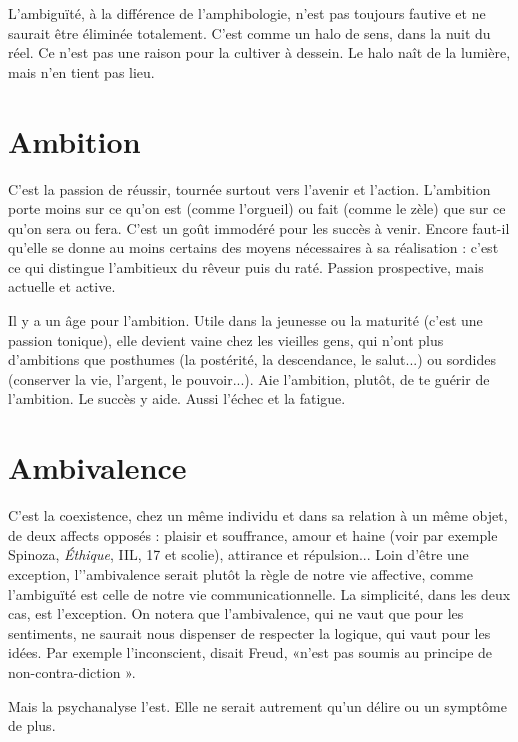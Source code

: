 L’ambiguïté, à la différence de l’amphibologie, n’est pas toujours fautive et
ne saurait être éliminée totalement. C’est comme un halo de sens, dans la nuit
du réel. Ce n’est pas une raison pour la cultiver à dessein. Le halo naît de la
lumière, mais n’en tient pas lieu.

\section{Ambition}
C'est la passion de réussir, tournée surtout vers l’avenir et l’action.
L’ambition porte moins sur ce qu’on est (comme l’orgueil) ou fait (comme
le zèle) que sur ce qu’on sera ou fera. C’est un goût immodéré pour les succès
à venir. Encore faut-il qu’elle se donne au moins certains des moyens nécessaires
à sa réalisation : c’est ce qui distingue l’ambitieux du rêveur puis du raté.
Passion prospective, mais actuelle et active.

Il y a un âge pour l’ambition. Utile dans la jeunesse ou la maturité (c’est
une passion tonique), elle devient vaine chez les vieilles gens, qui n’ont plus
d’ambitions que posthumes (la postérité, la descendance, le salut...) ou sordides
(conserver la vie, l'argent, le pouvoir...). Aie l'ambition, plutôt, de te
guérir de l’ambition. Le succès y aide. Aussi l’échec et la fatigue.

\section{Ambivalence}
C'est la coexistence, chez un même individu et dans sa relation
à un même objet, de deux affects opposés : plaisir et
souffrance, amour et haine (voir par exemple Spinoza, {\it Éthique}, IIL, 17 et
scolie), attirance et répulsion... Loin d’être une exception, l’'ambivalence serait
plutôt la règle de notre vie affective, comme l'ambiguïté est celle de notre vie
communicationnelle. La simplicité, dans les deux cas, est l’exception.
On notera que l’ambivalence, qui ne vaut que pour les sentiments, ne saurait
nous dispenser de respecter la logique, qui vaut pour les idées. Par exemple
l'inconscient, disait Freud, «n’est pas soumis au principe de non-contra-diction ».

Mais la psychanalyse l’est. Elle ne serait autrement qu’un délire ou
un symptôme de plus.

